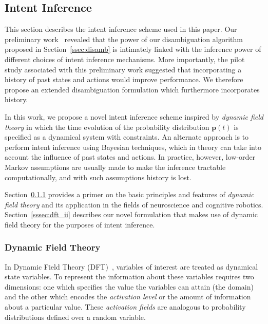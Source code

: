 \documentclass[natbib, twocolumn]{svjour3}          %
\begin{document}
\subsection{Intent Inference}\label{ssec:inference}
This section describes the intent inference scheme used in this paper. Our preliminary work~\citep{gopinath2017mode} revealed that the power of our disambiguation algorithm proposed in Section~\ref{ssec:disamb} is intimately linked with the inference power of different choices of intent inference mechanisms. More importantly, the pilot study associated with this preliminary work suggested that incorporating a history of past states and actions would improve performance. We therefore propose an extended disambiguation formulation which furthermore incorporates history.


In this work, we propose a novel intent inference scheme inspired by \textit{dynamic field theory} in which the time evolution of the probability distribution $\boldsymbol{p}(t)$ is specified as a dynamical system with constraints. An alternate approach is to perform intent inference using Bayesian techniques, which in theory can take into account the influence of past states and actions. In practice, however, low-order Markov assumptions are usually made to make the inference tractable computationally, and with such assumptions history is lost.

 Section~\ref{sssec:dft} provides a primer on the basic principles and features of \textit{dynamic field theory} and its application in the fields of neuroscience and cognitive robotics. Section~\ref{sssec:dft_ii} describes our novel formulation that makes use of dynamic field theory for the purposes of intent inference. 

\subsubsection{Dynamic Field Theory}\label{sssec:dft}

In Dynamic Field Theory (DFT)~\citep{schoner2015dynamic}, variables of interest are treated as dynamical state variables. To represent the information about these variables requires two dimensions: one which specifies the value the variables can attain (the domain) and the other which encodes the \textit{activation level} or the amount of information about a particular value. These \textit{activation fields} are analogous to probability distributions defined over a random variable. 
\end{document}
